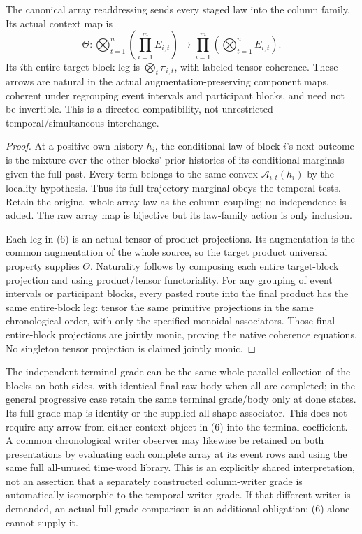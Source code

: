 \documentclass[11pt]{article}\usepackage{amsmath,amssymb,amsthm,geometry}\geometry{margin=1in}
\begin{document}
\begin{theorem}
The canonical array readdressing sends every staged law into the column family. Its actual context map is
\[
 \Theta:\bigotimes_{t=1}^n\left(\prod_{i=1}^mE_{i,t}\right)
          \longrightarrow
          \prod_{i=1}^m\left(\bigotimes_{t=1}^n E_{i,t}\right).       \tag{6}
\]
Its $i$th entire target-block leg is $\bigotimes_t\pi_{i,t}$, with labeled tensor coherence. These arrows are natural in the actual augmentation-preserving component maps, coherent under regrouping event intervals and participant blocks, and need not be invertible. This is a directed compatibility, not unrestricted temporal/simultaneous interchange.
\end{theorem}
\begin{proof}
At a positive own history $h_i$, the conditional law of block $i$'s next outcome is the mixture over the other blocks' prior histories of its conditional marginals given the full past. Every term belongs to the same convex $\mathcal A_{i,t}(h_i)$ by the locality hypothesis. Thus its full trajectory marginal obeys the temporal tests. Retain the original whole array law as the column coupling; no independence is added. The raw array map is bijective but its law-family action is only inclusion.

Each leg in (6) is an actual tensor of product projections. Its augmentation is the common augmentation of the whole source, so the target product universal property supplies $\Theta$. Naturality follows by composing each entire target-block projection and using product/tensor functoriality. For any grouping of event intervals or participant blocks, every pasted route into the final product has the same entire-block leg: tensor the same primitive projections in the same chronological order, with only the specified monoidal associators. Those final entire-block projections are jointly monic, proving the native coherence equations. No singleton tensor projection is claimed jointly monic.\end{proof}

The independent terminal grade can be the same whole parallel collection of the blocks on both sides, with identical final raw body when all are completed; in the general progressive case retain the same terminal grade/body only at done states. Its full grade map is identity or the supplied all-shape associator. This does not require any arrow from either context object in (6) into the terminal coefficient. A common chronological writer observer may likewise be retained on both presentations by evaluating each complete array at its event rows and using the same full all-unused time-word library. This is an explicitly shared interpretation, not an assertion that a separately constructed column-writer grade is automatically isomorphic to the temporal writer grade. If that different writer is demanded, an actual full grade comparison is an additional obligation; (6) alone cannot supply it.
\end{document}
